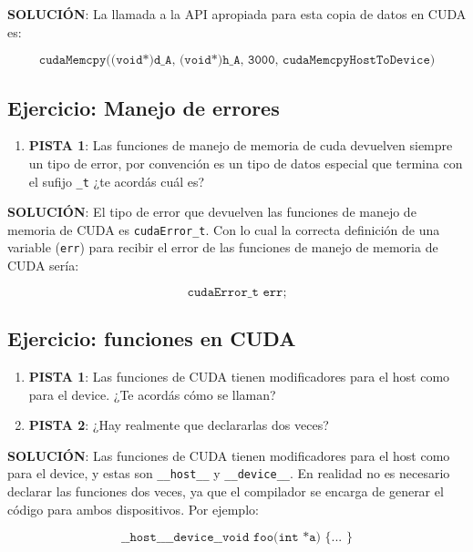 \textbf{SOLUCIÓN}: La llamada a la API apropiada para esta copia de datos en CUDA es:

\begin{equation}
  \texttt{cudaMemcpy((void*)d\_A, (void*)h\_A, 3000, cudaMemcpyHostToDevice)}
\end{equation}

\subsection{Ejercicio: Manejo de errores}

\begin{enumerate}
  \item \textbf{PISTA 1}: Las funciones de manejo de memoria de cuda devuelven siempre un tipo de error, por convención
    es un tipo de datos especial que termina con el sufijo \texttt{\_t} ¿te acordás cuál es?
\end{enumerate}

\textbf{SOLUCIÓN}: El tipo de error que devuelven las funciones de manejo de memoria de CUDA es \texttt{cudaError\_t}.
Con lo cual la correcta definición de una variable (\texttt{err}) para recibir el error de las funciones de manejo de
memoria de CUDA sería:

\begin{equation}
  \texttt{cudaError\_t err;}
\end{equation}

\subsection{Ejercicio: funciones en CUDA}

\begin{enumerate}
  \item \textbf{PISTA 1}: Las funciones de CUDA tienen modificadores para el host como para el device. ¿Te acordás cómo
    se llaman?

  \item \textbf{PISTA 2}: ¿Hay realmente que declararlas dos veces?
\end{enumerate}

\textbf{SOLUCIÓN}: Las funciones de CUDA tienen modificadores para el host como para el device, y estas son
\texttt{\_\_host\_\_} y \texttt{\_\_device\_\_}. En realidad no es necesario declarar las funciones dos veces, ya que el
compilador se encarga de generar el código para ambos dispositivos. Por ejemplo:

\begin{equation}
  \texttt{\_\_host\_\_ \_\_device\_\_ void foo(int *a) \{ ... \}}
\end{equation}




